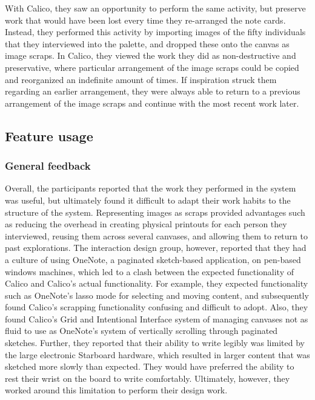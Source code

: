 With Calico, they saw an opportunity to perform the same activity, but preserve work that would have been lost every time they re-arranged the note cards. Instead, they performed this activity by importing images of the fifty individuals that they interviewed into the palette, and dropped these onto the canvas as image scraps. In Calico, they viewed the work they did as non-destructive and preservative, where particular arrangement of the image scraps could be copied and reorganized an indefinite amount of times. If inspiration struck them regarding an earlier arrangement, they were always able to return to a previous arrangement of the image scraps and continue with the most recent work later.

\subsection{Feature usage}

\subsubsection{General feedback}

Overall, the participants reported that the work they performed in the system was useful, but ultimately found it difficult to adapt their work habits to the structure of the system. Representing images as scraps provided advantages such as reducing the overhead in creating physical printouts for each person they interviewed, reusing them across several canvases, and allowing them to return to past explorations. The interaction design group, however, reported that they had a culture of using OneNote, a paginated sketch-based application, on pen-based windows machines, which led to a clash between the expected functionality of Calico and Calico's actual functionality. For example, they expected functionality such as OneNote's lasso mode for selecting and moving content, and subsequently found Calico's scrapping functionality confusing and difficult to adopt. Also, they found Calico's Grid and Intentional Interface system of managing canvases not as fluid to use as OneNote's system of vertically scrolling through paginated sketches. Further, they reported that their ability to write legibly was limited by the large electronic Starboard hardware, which resulted in larger content that was sketched more slowly than expected. They would have preferred the ability to rest their wrist on the board to write comfortably. Ultimately, however, they worked around this limitation to perform their design work.

